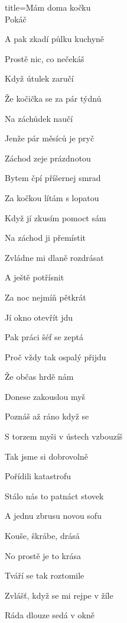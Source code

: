 \begin{song}{title=\centering Mám doma kočku\\\normalsize Pokáč \vspace*{-0.3cm}}
{\begin{minipage}[t]{0.48\textwidth}
   A pak zkadí půlku kuchyně
   
   
\sloka
   Prostě nic, co nečekáš
   
   Když útulek zaručí
   
   Že kočička se za pár týdnů
   
   Na záchůdek naučí
  
  
\end{minipage}\begin{minipage}[t]{0.5\textwidth}\setlength{\parindent}{0.45cm}\vspace*{0.44cm}  %

\sloka   
   Jenže pár měsíců je pryč
   
   Záchod zeje prázdnotou
   
   Bytem čpí příšernej smrad
   
   Za kočkou lítám s lopatou
 
 
\sloka
   Když jí zkusím pomoct sám
   
   Na záchod ji přemístit
   
   Zvládne mi dlaně rozdrásat
   
   A ještě potřísnit
  
   
   
   
\sloka
   Za noc nejmíň pětkrát
   
   Jí okno otevřít jdu
   
   Pak práci šéf se zeptá
   
   Proč vždy tak ospalý přijdu
   
   
\sloka
   Že občas hrdě nám
   
   Donese zakouslou myš
   
   Poznáš až ráno když se
   
   S torzem myši v ústech vzbouzíš
  
   
\sloka
   Tak jsme si dobrovolně
   
   Pořídili katastrofu
   
   Stálo nás to patnáct stovek
   
   A jednu zbrusu novou sofu
   
   
\sloka
   Kouše, škrábe, drásá
   
   No prostě je to krása
   
   Tváří se tak roztomile
   
   Zvlášť, když se mi rejpe v žíle
   
   
   
   
\sloka
   Ráda dlouze sedá v okně
   

\end{minipage}}
\end{song}
